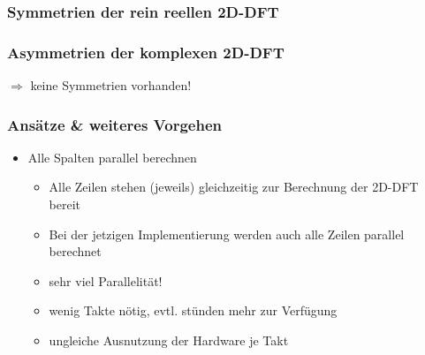 \begin{frame}[t]\frametitle{Symmetrien der rein reellen 2D-DFT}
\hspace{-.5cm}
\begin{minipage}{0.49\textwidth}


\end{minipage}\hspace{-.3cm}\vrule\hspace{0.1cm}
\pause
\begin{minipage}{0.499\textwidth}


\end{minipage}
\end{frame}

\begin{frame}\frametitle{Asymmetrien der komplexen 2D-DFT}
 
 \begin{center}
 $\Rightarrow$ keine Symmetrien vorhanden!
 \end{center}
\end{frame}


\begin{frame}\frametitle{Ansätze \& weiteres Vorgehen}
\begin{itemize}
 \item Alle Spalten parallel berechnen
 \begin{itemize}
  \item Alle Zeilen stehen (jeweils) gleichzeitig zur Berechnung der 2D-DFT bereit
  \item Bei der jetzigen Implementierung werden auch alle Zeilen parallel berechnet
  \item sehr viel Parallelität!
  \item wenig Takte nötig, evtl. stünden mehr zur Verfügung
  \item ungleiche Ausnutzung der Hardware je Takt
 \end{itemize}
\end{itemize}
\end{frame}


